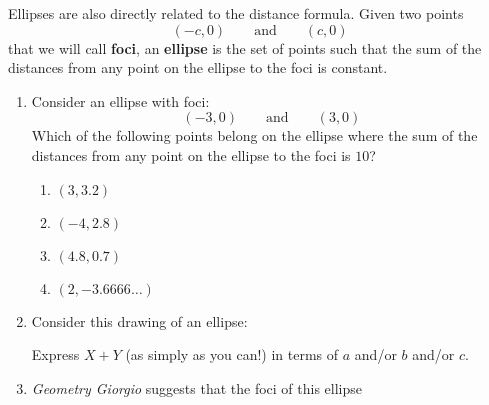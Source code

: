 \documentclass[nooutcomes,noauthor]{ximera}
\begin{document}
\begin{question}
  Ellipses are also directly related to the distance formula.  Given
  two points
  \[
  (-c,0) \qquad\text{and} \qquad (c,0)
  \]
  that we will call \textbf{foci}, an \textbf{ellipse} is the set
  of points such that the sum of the distances from any point on
  the ellipse to the foci is constant.
  \begin{enumerate}      
  \item Consider an ellipse with foci:
    \[
    (-3,0) \qquad \text{and}\qquad (3,0)
    \]%
    Which of the following points belong on the ellipse where the sum
    of the distances from any point on the ellipse to the foci is
    $10$?
    \begin{enumerate}
    \item $(3,3.2)$ %
    \item $(-4,2.8)$ %
    \item $(4.8,0.7)$ %
    \item $(2,-3.6666\dots)$ %
    \end{enumerate}
    \item Consider this drawing of an ellipse:
      \begin{center}
      \end{center}
      Express $X+Y$ (as simply as you can!) in terms of $a$ and/or $b$
      and/or $c$.
    \item \textit{Geometry Giorgio} suggests that the foci of this ellipse
      \begin{center}
\end{center}
\end{enumerate}
\end{question}
\end{document}
